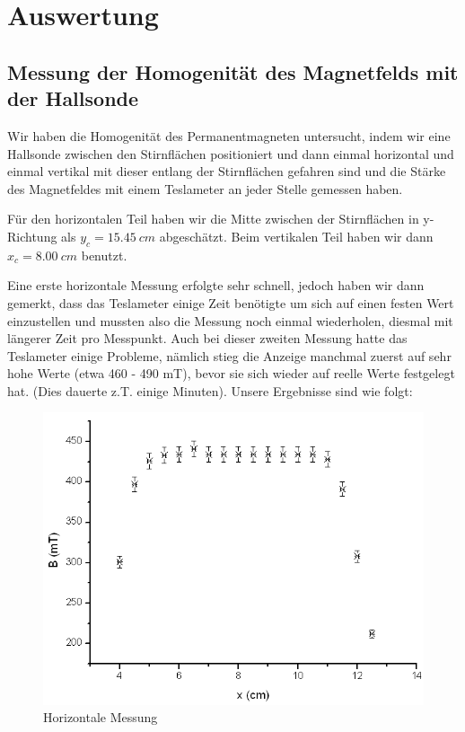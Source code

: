 \clearpage
\section{Auswertung}

\subsection{Messung der Homogenität des Magnetfelds mit der Hallsonde}

Wir haben die Homogenität des Permanentmagneten untersucht, indem wir eine Hallsonde zwischen den Stirnflächen positioniert und dann einmal horizontal und einmal vertikal mit dieser entlang der Stirnflächen gefahren sind und die Stärke des Magnetfeldes mit einem Teslameter an jeder Stelle gemessen haben.

Für den horizontalen Teil haben wir die Mitte zwischen der Stirnflächen in y-Richtung als $y_c = 15.45\ cm$ abgeschätzt. Beim vertikalen Teil haben wir dann $x_c = 8.00\ cm$ benutzt.

Eine erste horizontale Messung erfolgte sehr schnell, jedoch haben wir dann gemerkt, dass das Teslameter einige Zeit benötigte um sich auf einen festen Wert einzustellen und mussten also die Messung noch einmal wiederholen, diesmal mit längerer Zeit pro Messpunkt. Auch bei dieser zweiten Messung hatte das Teslameter einige Probleme, nämlich stieg die Anzeige manchmal zuerst auf sehr hohe Werte (etwa 460 - 490 mT), bevor sie sich wieder auf reelle Werte festgelegt hat. (Dies dauerte z.T. einige Minuten). Unsere Ergebnisse sind wie folgt:

\begin{figure}[H]
\centering \includegraphics[width=\textwidth]{Bilder/Hallx.png}
\caption{Horizontale Messung}
\end{figure}

